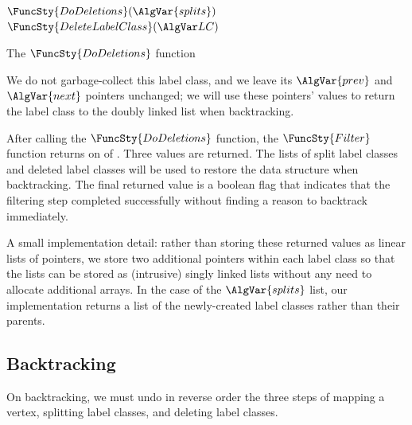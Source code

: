 \begin{algorithm}[htb]
\AlgorithmFontSize
\DontPrintSemicolon
\nl $\FuncSty{DoDeletions}(\AlgVar{splits})$ \;
\nl {}
\;
\nl $\FuncSty{DeleteLabelClass}(\LC)$ \;
\nl {}
\caption{The $\FuncSty{DoDeletions}$ function}
\label{McSplitSIAlgDelete}
\end{algorithm}

We do not garbage-collect this label class, and
we leave its $\AlgVar{prev}$ and $\AlgVar{next}$ 
pointers unchanged; we will use these pointers' values to return
the label class to the doubly linked list when backtracking.

After calling the $\FuncSty{DoDeletions}$ function,
the $\FuncSty{Filter}$ function returns on  
of .  Three values are returned. The lists
of split label classes and deleted label classes will be used to restore
the data structure when backtracking. The final returned value is a boolean
flag that indicates that the filtering step completed successfully
without finding a reason to backtrack immediately.

A small implementation detail: rather than storing these returned values
as linear lists of pointers, we store two additional pointers within
each label class so that the lists can be stored as (intrusive) singly linked
lists without any need to allocate additional arrays.  In the case of the
$\AlgVar{splits}$ list, our implementation returns a list of the newly-created
label classes rather than their parents.

\subsection{Backtracking}

On backtracking, we must undo in reverse order the three steps of
mapping a vertex, splitting label classes, and deleting label classes.

